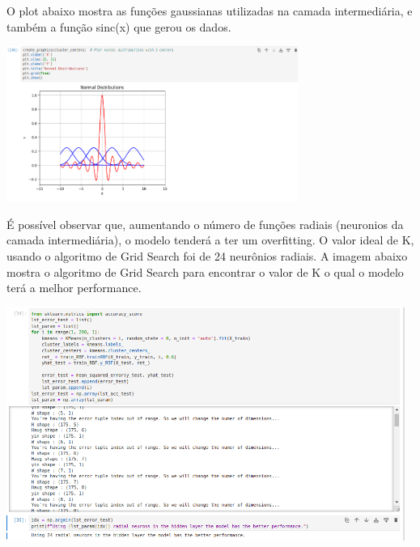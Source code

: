 \documentclass{article}
\begin{document}
\vspace{10pt}

O plot abaixo mostra as funções gaussianas utilizadas na camada intermediária, e também a função sinc(x) que gerou os dados.

\vspace{10pt}

\begin{center}

\includegraphics[height=2in]{plot_sinc_gauss.png}
        
\end{center}

\vspace{10pt}

É possível observar que, aumentando o número de funções radiais (neuronios da camada intermediária), o modelo tenderá a ter um overfitting. O valor ideal de K, usando o algoritmo de Grid Search foi de 24 neurônios radiais. A imagem abaixo mostra o algoritmo de Grid Search para encontrar o valor de K o qual o modelo terá a melhor performance.

\vspace{10pt}

\begin{center}

\includegraphics[height=3in]{best_K_sinc.png}
        
\end{center}
\end{document}
